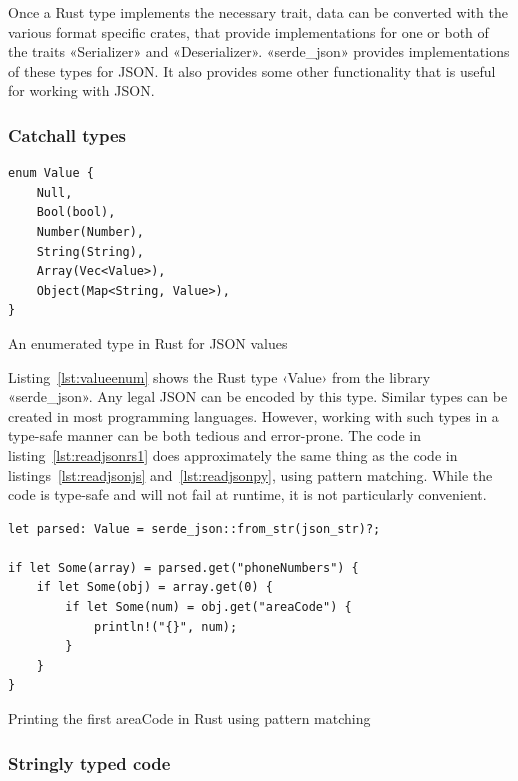 Once a Rust type implements the necessary trait, data can be converted with the various format specific crates, that provide implementations for one or both of the traits «Serializer» and «Deserializer». «serde_json»\cite{serdejson} provides implementations of these types for JSON. It also provides some other functionality that is useful for working with JSON.

\subsubsection{Catchall types}

\begin{listing}[ht!]
\begin{verbatim}
enum Value {
    Null,
    Bool(bool),
    Number(Number),
    String(String),
    Array(Vec<Value>),
    Object(Map<String, Value>),
}
\end{verbatim}
\caption{An enumerated type in Rust for JSON values}
\label{lst:valueenum}
\end{listing}

Listing~\ref{lst:valueenum} shows the Rust type ‹Value› from the library «serde_json». Any legal JSON can be encoded by this type. Similar types can be created in most programming languages. However, working with such types in a type-safe manner can be both tedious and error-prone. The code in listing~\ref{lst:readjsonrs1} does approximately the same thing as the code in listings~\ref{lst:readjsonjs} and~\ref{lst:readjsonpy}, using pattern matching. While the code is type-safe and will not fail at runtime, it is not particularly convenient.

\begin{listing}[ht!]
\begin{verbatim}
let parsed: Value = serde_json::from_str(json_str)?;

if let Some(array) = parsed.get("phoneNumbers") {
    if let Some(obj) = array.get(0) {
        if let Some(num) = obj.get("areaCode") {
            println!("{}", num);
        }
    }
}
\end{verbatim}
\caption{Printing the first areaCode in Rust using pattern matching}
\label{lst:readjsonrs1}
\end{listing}


\subsubsection{Stringly typed code}

